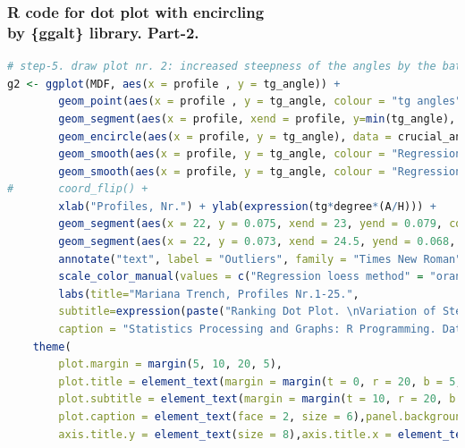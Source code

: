 \documentclass[pdflatex,compress,10pt,
	xcolor={dvipsnames,dvipsnames,svgnames,x11names,table},
	hyperref={colorlinks = true,breaklinks = true, urlcolor = NavyBlue, breaklinks = true}]{beamer}
\begin{document}
\begin{frame}[fragile,shrink=20,]\frametitle{R code for dot plot with encircling \\by \{ggalt\} library. Part-2.}
\begin{lstlisting}[language=R]
	# step-5. draw plot nr. 2: increased steepness of the angles by the bathymetric profiles 1:25 (tangents) 
g2 <- ggplot(MDF, aes(x = profile , y = tg_angle)) +   
		geom_point(aes(x = profile , y = tg_angle, colour = "tg angles"), size=3, alpha = .5, show.legend=TRUE) +    # Draw points  
		geom_segment(aes(x = profile, xend = profile, y=min(tg_angle), yend=max(tg_angle)),linetype="dashed", size=0.1) +   # Draw dashed lines    
	  	geom_encircle(aes(x = profile, y = tg_angle), data = crucial_angles, color="red", size=1, expand=0.05) +   # encircle 
		geom_smooth(aes(x = profile, y = tg_angle, colour = "Regression loess method"), method = loess, se = FALSE, size = .3, linetype = "solid", span = 1, show.legend=TRUE) +
		geom_smooth(aes(x = profile, y = tg_angle, colour = "Regression lm method"), method = lm, formula = y ~ splines::bs(x, 3), se = FALSE, size=.3, linetype = "solid", show.legend=TRUE) +
#	  	coord_flip() +   
		xlab("Profiles, Nr.") + ylab(expression(tg*degree*(A/H))) +
		geom_segment(aes(x = 22, y = 0.075, xend = 23, yend = 0.079, color = "arrow"), size = .2, arrow = arrow(length = unit(0.1, "cm"))) + # draw arrow 1
		geom_segment(aes(x = 22, y = 0.073, xend = 24.5, yend = 0.068, color = "arrow"), size = .2, arrow = arrow(length = unit(0.1, "cm"))) + # draw arrow 2
		annotate("text", label = "Outliers", family = "Times New Roman", size = 3, color = "red", x = 22, y = 0.074) + # subscript annotation text by arrow (here: number of bathymetric observations)
		scale_color_manual(values = c("Regression loess method" = "orange", "Regression lm method" = "blue", "tg angles" = "purple", "arrow" = "red")) +  
		labs(title="Mariana Trench, Profiles Nr.1-25.", 
		subtitle=expression(paste("Ranking Dot Plot. \nVariation of Steepness Angles ", tg*degree*(A/H), " by profiles 1:25")),
		caption = "Statistics Processing and Graphs: R Programming. Data Source: QGIS") +
	theme(
		plot.margin = margin(5, 10, 20, 5),
		plot.title = element_text(margin = margin(t = 0, r = 20, b = 5, l = 0), family = "Kai", face = "bold", size = 12), 
		plot.subtitle = element_text(margin = margin(t = 10, r = 20, b = 10, l = 0), family = "Hei", face = "bold", size = 10), 
		plot.caption = element_text(face = 2, size = 6),panel.background=ggplot2::element_rect(fill = "white"),
		axis.title.y = element_text(size = 8),axis.title.x = element_text(size = 8),

\end{lstlisting}
\end{frame}
\end{document}
